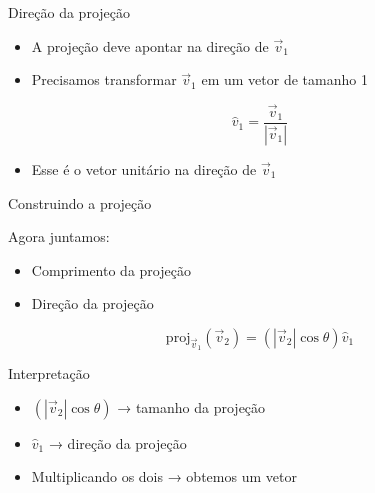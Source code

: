 \documentclass{beamer}
\begin{document}
\begin{frame}{Direção da projeção}


\vspace{0.5cm}

\begin{itemize}
    \item A projeção deve apontar na direção de $\vec{v}_1$
    \item Precisamos transformar $\vec{v}_1$ em um vetor de tamanho 1
\end{itemize}

\vspace{0.5cm}

\[
\hat{v}_1 = \frac{\vec{v}_1}{|\vec{v}_1|}
\]

\vspace{0.5cm}

\begin{itemize}
    \item Esse é o vetor unitário na direção de $\vec{v}_1$
\end{itemize}

\end{frame}
\begin{frame}{Construindo a projeção}


\vspace{0.5cm}

Agora juntamos:

\begin{itemize}
    \item Comprimento da projeção
    \item Direção da projeção
\end{itemize}

\vspace{0.5cm}

\[
\mathrm{proj}_{\vec{v}_1}(\vec{v}_2)
=
(|\vec{v}_2| \cos\theta)\hat{v}_1
\]

\end{frame}
\begin{frame}{Interpretação}


\vspace{0.5cm}

\begin{itemize}
    \item $(|\vec{v}_2| \cos\theta)$ → tamanho da projeção
    \item $\hat{v}_1$ → direção da projeção
    \item Multiplicando os dois → obtemos um vetor
\end{itemize}

\end{frame}
\end{document}
